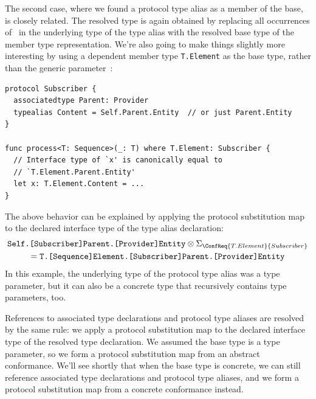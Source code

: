 \documentclass[../generics]{subfiles}
\begin{document}
The second case, where we found a protocol type alias as a member of the base, is closely related. The resolved type is again obtained by replacing all occurrences of \tSelf\ in the underlying type of the type alias with the resolved base type of the member type representation. We're also going to make things slightly more interesting by using a dependent member type \texttt{T.Element} as the base type, rather than the generic parameter~\tT:
\begin{Verbatim}
protocol Subscriber {
  associatedtype Parent: Provider
  typealias Content = Self.Parent.Entity  // or just Parent.Entity
}

func process<T: Sequence>(_: T) where T.Element: Subscriber {
  // Interface type of `x' is canonically equal to
  // `T.Element.Parent.Entity'
  let x: T.Element.Content = ...
}
\end{Verbatim}
The above behavior can be explained by applying the protocol substitution map to the declared interface type of the type alias declaration:
\begin{multline*}
\texttt{Self.[Subscriber]Parent.[Provider]Entity}\otimes\Sigma_{\ConfReq{T.Element}{Subscriber}}\\
=\texttt{T.[Sequence]Element.[Subscriber]Parent.[Provider]Entity}
\end{multline*}
In this example, the underlying type of the protocol type alias was a type parameter, but it can also be a concrete type that recursively contains type parameters, too.

\smallskip

References to associated type declarations and protocol type aliases are resolved by the same rule: we apply a protocol substitution map to the declared interface type of the resolved type declaration. We assumed the base type is a type parameter, so we form a protocol substitution map from an abstract conformance. We'll see shortly that when the base type is concrete, we can still reference associated type declarations and protocol type aliases, and we form a protocol substitution map from a concrete conformance instead.
\end{document}
